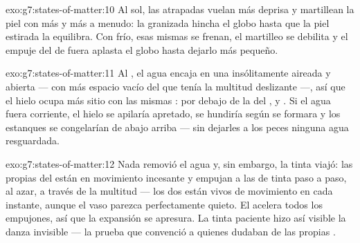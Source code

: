 \begin{solution}{exo:g7:states-of-matter:10}
Al sol, las  atrapadas vuelan más deprisa y martillean la
piel con más  y más a menudo: la granizada hincha el globo hasta
que la piel estirada la equilibra. Con frío, esas mismas
 se frenan, el martilleo se debilita y el empuje del
 de fuera aplasta el globo hasta dejarlo más pequeño.
\end{solution}

\begin{solution}{exo:g7:states-of-matter:11}
Al , el agua encaja en una  insólitamente aireada y
abierta --- con más espacio vacío del que tenía la multitud
deslizante ---, así que el hielo ocupa más sitio con las mismas
:  por debajo de la del , y
. Si el agua fuera corriente, el hielo se apilaría apretado,
se hundiría según se formara y los estanques se congelarían de
abajo arriba --- sin dejarles a los peces ninguna agua resguardada.
\end{solution}

\begin{solution}{exo:g7:states-of-matter:12}
Nada removió el agua y, sin embargo, la tinta viajó: las propias
 del  están en movimiento incesante y empujan
a las  de tinta paso a paso, al azar, a través de la
multitud --- los dos  están vivos de movimiento en cada
instante, aunque el vaso parezca perfectamente quieto. El 
acelera todos los empujones, así que la expansión se apresura. La
tinta paciente hizo así visible la danza invisible --- la prueba que
convenció a quienes dudaban de las propias .
\end{solution}

